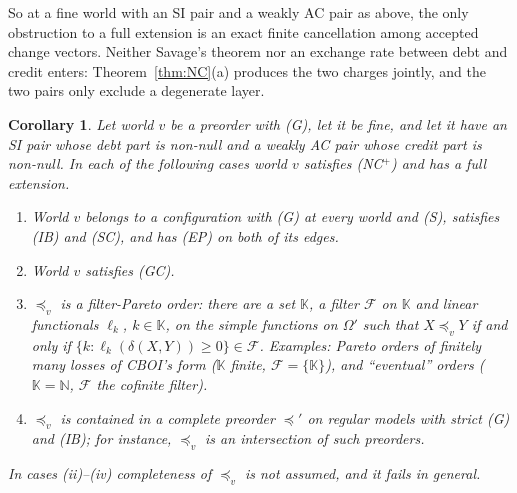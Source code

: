 \documentclass[11pt]{article}
\newtheorem{corollary}[theorem]{Corollary}
\theoremstyle{definition}\newtheorem{definition}[theorem]{Definition}
\theoremstyle{remark}\newtheorem{remark}[theorem]{Remark}
\begin{document}
So at a fine world with an SI pair and a weakly AC pair as above, the only
obstruction to a full extension is an exact finite cancellation among
accepted change vectors. Neither Savage's theorem nor an exchange rate
between debt and credit enters: Theorem~\ref{thm:NC}(a) produces the two
charges jointly, and the two pairs only exclude a degenerate layer.

\begin{corollary}\label{cor:NCclasses}
Let world $v$ be a preorder with (G), let it be fine, and let it have an SI
pair whose debt part is non-null and a weakly AC pair whose credit part is
non-null. In each of the following cases world $v$ satisfies (NC$^+$) and
has a full extension.
\begin{enumerate}[label=(\roman*),leftmargin=*,itemsep=2pt]
\item World $v$ belongs to a configuration with (G) at every world and (S),
satisfies (IB) and (SC), and has (EP) on both of its edges.
\item World $v$ satisfies (GC).
\item $\preceq_v$ is a \emph{filter-Pareto order}: there are a set
$\mathbb K$, a filter $\mathcal F$ on $\mathbb K$ and linear functionals
$\ell_k$, $k\in\mathbb K$, on the simple functions on $\Omega'$ such that
$X\preceq_vY$ if and only if $\{k:\ell_k(\delta(X,Y))\ge0\}\in\mathcal F$.
Examples: Pareto orders of finitely many losses of CBOI's form
($\mathbb K$ finite, $\mathcal F=\{\mathbb K\}$), and ``eventual'' orders
($\mathbb K=\mathbb N$, $\mathcal F$ the cofinite filter).
\item $\preceq_v$ is contained in a complete preorder $\preceq'$ on regular
models with strict (G) and (IB); for instance, $\preceq_v$ is an
intersection of such preorders.
\end{enumerate}
In cases (ii)--(iv) completeness of $\preceq_v$ is not assumed, and it fails
in general.
\end{corollary}
\end{document}
